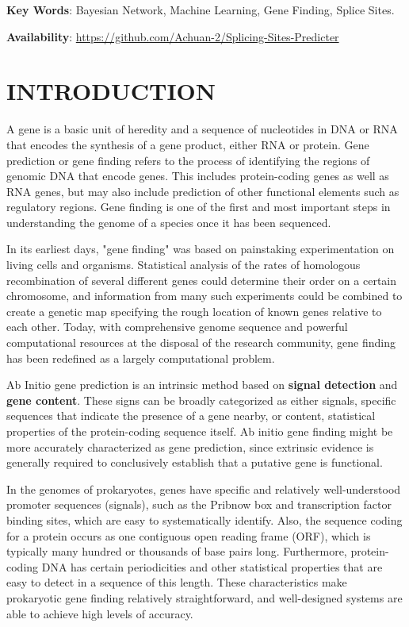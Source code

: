\documentclass{gapd}
\begin{document}
\maketitle

\textbf{Key Words}: Bayesian Network, Machine Learning, Gene Finding, Splice Sites.

\textbf{Availability}: \href{https://github.com/Achuan-2/Splicing-Sites-Predicter}{https://github.com/Achuan-2/Splicing-Sites-Predicter}

\section{INTRODUCTION}\label{introduction}

\lettrine{A}{}  gene is a basic unit of heredity and a sequence of nucleotides in DNA
or RNA that encodes the synthesis of a gene product, either RNA or
protein. Gene prediction or gene finding refers to the process of
identifying the regions of genomic DNA that encode genes. This includes
protein-coding genes as well as RNA genes, but may also include
prediction of other functional elements such as regulatory regions. Gene
finding is one of the first and most important steps in understanding
the genome of a species once it has been sequenced.

In its earliest days, "gene finding" was based on painstaking
experimentation on living cells and organisms. Statistical analysis of
the rates of homologous recombination of several different genes could
determine their order on a certain chromosome, and information from many
such experiments could be combined to create a genetic map specifying
the rough location of known genes relative to each other. Today, with
comprehensive genome sequence and powerful computational resources at
the disposal of the research community, gene finding has been redefined
as a largely computational problem.

Ab Initio gene prediction is an intrinsic method based on \textbf{signal
detection} and \textbf{gene content}. These signs can be broadly
categorized as either signals, specific sequences that indicate the
presence of a gene nearby, or content, statistical properties of the
protein-coding sequence itself. Ab initio gene finding might be more
accurately characterized as gene prediction, since extrinsic evidence is
generally required to conclusively establish that a putative gene is
functional.

In the genomes of prokaryotes, genes have specific and relatively
well-understood promoter sequences (signals), such as the Pribnow box
and transcription factor binding sites, which are easy to systematically
identify. Also, the sequence coding for a protein occurs as one
contiguous open reading frame (ORF), which is typically many hundred or
thousands of base pairs long. Furthermore, protein-coding DNA has
certain periodicities and other statistical properties that are easy to
detect in a sequence of this length. These characteristics make
prokaryotic gene finding relatively straightforward, and well-designed
systems are able to achieve high levels of accuracy.
\end{document}
